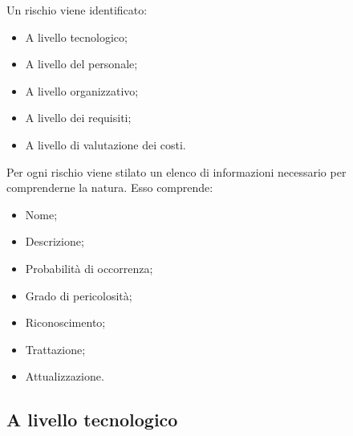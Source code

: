 	Un rischio viene identificato: 
	
	\begin{itemize}
		\item A livello tecnologico; 
		\item A livello del personale;
		\item A livello organizzativo;
		\item A livello dei requisiti;
		\item A livello di valutazione dei costi.
	\end{itemize}
	
	Per ogni rischio viene stilato un elenco di informazioni necessario per comprenderne la natura. Esso comprende: 
	
	\begin{itemize}
		\item Nome; 
		\item Descrizione;
		\item Probabilità di occorrenza;
		\item Grado di pericolosità;
		\item Riconoscimento;
		\item Trattazione;
		\item Attualizzazione.
	\end{itemize}

	\subsection{A livello tecnologico}
	
